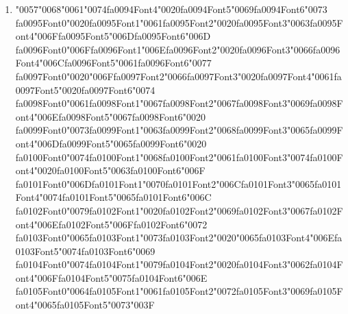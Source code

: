 \documentclass[11pt]{article}
\begin{document}
\begin{enumerate}[leftmargin=*]
  \item {\char"0057}{\char"0068}{\char"0061}{\char"0074}{\csname fa0094Font4\endcsname\char"0020}{\csname fa0094Font5\endcsname\char"0069}{\csname fa0094Font6\endcsname\char"0073} {\csname fa0095Font0\endcsname\char"0020}{\csname fa0095Font1\endcsname\char"0061}{\csname fa0095Font2\endcsname\char"0020}{\csname fa0095Font3\endcsname\char"0063}{\csname fa0095Font4\endcsname\char"006F}{\csname fa0095Font5\endcsname\char"006D}{\csname fa0095Font6\endcsname\char"006D} {\csname fa0096Font0\endcsname\char"006F}{\csname fa0096Font1\endcsname\char"006E}{\csname fa0096Font2\endcsname\char"0020}{\csname fa0096Font3\endcsname\char"0066}{\csname fa0096Font4\endcsname\char"006C}{\csname fa0096Font5\endcsname\char"0061}{\csname fa0096Font6\endcsname\char"0077} {\csname fa0097Font0\endcsname\char"0020}{\char"006F}{\csname fa0097Font2\endcsname\char"0066}{\csname fa0097Font3\endcsname\char"0020}{\csname fa0097Font4\endcsname\char"0061}{\csname fa0097Font5\endcsname\char"0020}{\csname fa0097Font6\endcsname\char"0074} {\csname fa0098Font0\endcsname\char"0061}{\csname fa0098Font1\endcsname\char"0067}{\csname fa0098Font2\endcsname\char"0067}{\csname fa0098Font3\endcsname\char"0069}{\csname fa0098Font4\endcsname\char"006E}{\csname fa0098Font5\endcsname\char"0067}{\csname fa0098Font6\endcsname\char"0020} {\csname fa0099Font0\endcsname\char"0073}{\csname fa0099Font1\endcsname\char"0063}{\csname fa0099Font2\endcsname\char"0068}{\csname fa0099Font3\endcsname\char"0065}{\csname fa0099Font4\endcsname\char"006D}{\csname fa0099Font5\endcsname\char"0065}{\csname fa0099Font6\endcsname\char"0020} {\csname fa0100Font0\endcsname\char"0074}{\csname fa0100Font1\endcsname\char"0068}{\csname fa0100Font2\endcsname\char"0061}{\csname fa0100Font3\endcsname\char"0074}{\csname fa0100Font4\endcsname\char"0020}{\csname fa0100Font5\endcsname\char"0063}{\csname fa0100Font6\endcsname\char"006F} {\csname fa0101Font0\endcsname\char"006D}{\csname fa0101Font1\endcsname\char"0070}{\csname fa0101Font2\endcsname\char"006C}{\csname fa0101Font3\endcsname\char"0065}{\csname fa0101Font4\endcsname\char"0074}{\csname fa0101Font5\endcsname\char"0065}{\csname fa0101Font6\endcsname\char"006C} {\csname fa0102Font0\endcsname\char"0079}{\csname fa0102Font1\endcsname\char"0020}{\csname fa0102Font2\endcsname\char"0069}{\csname fa0102Font3\endcsname\char"0067}{\csname fa0102Font4\endcsname\char"006E}{\csname fa0102Font5\endcsname\char"006F}{\csname fa0102Font6\endcsname\char"0072} {\csname fa0103Font0\endcsname\char"0065}{\csname fa0103Font1\endcsname\char"0073}{\csname fa0103Font2\endcsname\char"0020}{\char"0065}{\csname fa0103Font4\endcsname\char"006E}{\csname fa0103Font5\endcsname\char"0074}{\csname fa0103Font6\endcsname\char"0069} {\csname fa0104Font0\endcsname\char"0074}{\csname fa0104Font1\endcsname\char"0079}{\csname fa0104Font2\endcsname\char"0020}{\csname fa0104Font3\endcsname\char"0062}{\csname fa0104Font4\endcsname\char"006F}{\csname fa0104Font5\endcsname\char"0075}{\csname fa0104Font6\endcsname\char"006E} {\csname fa0105Font0\endcsname\char"0064}{\csname fa0105Font1\endcsname\char"0061}{\csname fa0105Font2\endcsname\char"0072}{\csname fa0105Font3\endcsname\char"0069}{\csname fa0105Font4\endcsname\char"0065}{\csname fa0105Font5\endcsname\char"0073}{\char"003F}

\end{enumerate}
\end{document}
